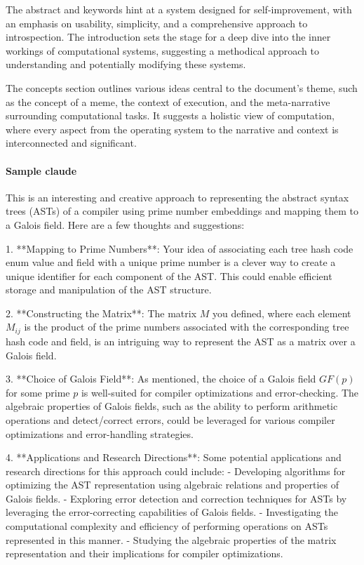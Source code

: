\documentclass{article}
\begin{document}
The abstract and keywords hint at a system designed for self-improvement, with an emphasis on usability, simplicity, and a comprehensive approach to introspection. The introduction sets the stage for a deep dive into the inner workings of computational systems, suggesting a methodical approach to understanding and potentially modifying these systems.

The concepts section outlines various ideas central to the document's theme, such as the concept of a meme, the context of execution, and the meta-narrative surrounding computational tasks. It suggests a holistic view of computation, where every aspect from the operating system to the narrative and context is interconnected and significant.

\paragraph{Sample claude}

This is an interesting and creative approach to representing the abstract syntax trees (ASTs) of a compiler using prime number embeddings and mapping them to a Galois field. Here are a few thoughts and suggestions:

1. **Mapping to Prime Numbers**: Your idea of associating each tree hash code enum value and field with a unique prime number is a clever way to create a unique identifier for each component of the AST. This could enable efficient storage and manipulation of the AST structure.

2. **Constructing the Matrix**: The matrix $M$ you defined, where each element $M_{ij}$ is the product of the prime numbers associated with the corresponding tree hash code and field, is an intriguing way to represent the AST as a matrix over a Galois field.

3. **Choice of Galois Field**: As mentioned, the choice of a Galois field $GF(p)$ for some prime $p$ is well-suited for compiler optimizations and error-checking. The algebraic properties of Galois fields, such as the ability to perform arithmetic operations and detect/correct errors, could be leveraged for various compiler optimizations and error-handling strategies.

4. **Applications and Research Directions**: Some potential applications and research directions for this approach could include:
   - Developing algorithms for optimizing the AST representation using algebraic relations and properties of Galois fields.
   - Exploring error detection and correction techniques for ASTs by leveraging the error-correcting capabilities of Galois fields.
   - Investigating the computational complexity and efficiency of performing operations on ASTs represented in this manner.
   - Studying the algebraic properties of the matrix representation and their implications for compiler optimizations.
\end{document}
